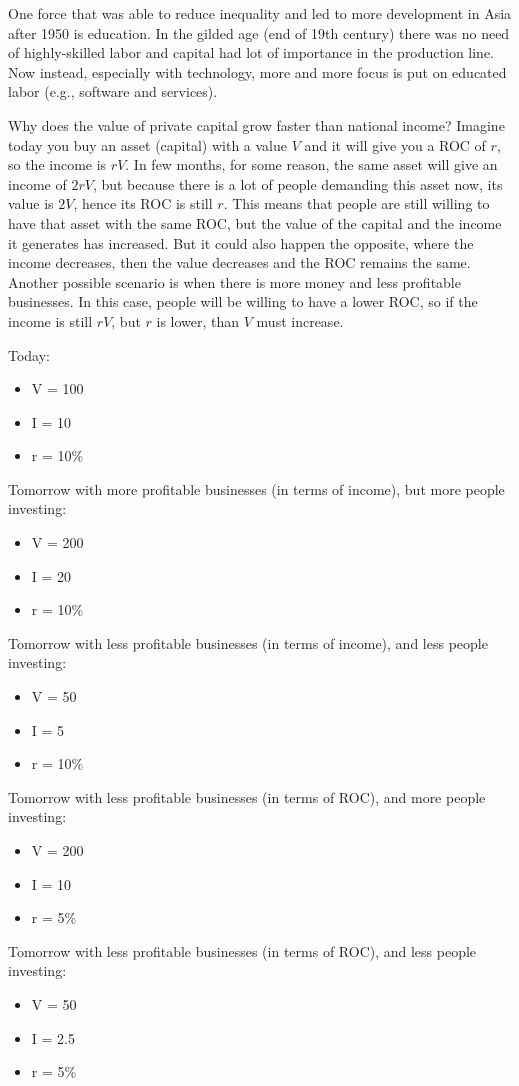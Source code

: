 One force that was able to reduce inequality and led to more development in Asia after 1950 is education. In the gilded age (end of 19th century) there was no need of highly-skilled labor and capital had lot of importance in the production line. Now instead, especially with technology, more and more focus is put on educated labor (e.g., software and services).

Why does the value of private capital grow faster than national income? Imagine today you buy an asset (capital) with a value $V$ and it will give you a ROC of $r$, so the income is $rV$. In few months, for some reason, the same asset will give an income of $2rV$, but because there is a lot of people demanding this asset now, its value is $2V$, hence its ROC is still $r$. This means that people are still willing to have that asset with the same ROC, but the value of the capital and the income it generates has increased. But it could also happen the opposite, where the income decreases, then the value decreases and the ROC remains the same. Another possible scenario is when there is more money and less profitable businesses. In this case, people will be willing to have a lower ROC, so if the income is still $rV$, but $r$ is lower, than $V$ must increase.

Today:
\begin{itemize}
    \item V = 100
    \item I = 10
    \item r = 10\%
\end{itemize}
Tomorrow with more profitable businesses (in terms of income), but more people investing:
\begin{itemize}
    \item V = 200
    \item I = 20
    \item r = 10\%
\end{itemize}
Tomorrow with less profitable businesses (in terms of income), and less people investing:
\begin{itemize}
    \item V = 50
    \item I = 5
    \item r = 10\%
\end{itemize}
Tomorrow with less profitable businesses (in terms of ROC), and more people investing:
\begin{itemize}
    \item V = 200
    \item I = 10
    \item r = 5\%
\end{itemize}
Tomorrow with less profitable businesses (in terms of ROC), and less people investing:
\begin{itemize}
    \item V = 50
    \item I = 2.5
    \item r = 5\%
\end{itemize}

